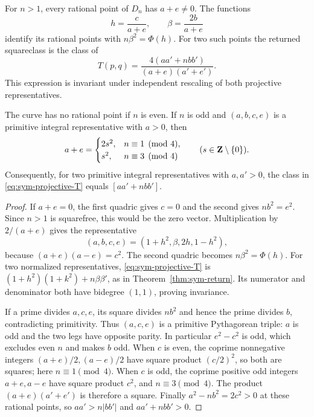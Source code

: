 \begin{proposition}
\label{prop:sym-normalization}
For $n>1$, every rational point of $D_n$ has $a+e\ne0$.
The functions
\[
 h=\frac{c}{a+e},\qquad \beta=\frac{2b}{a+e}
\]
identify its rational points with $n\beta^2=\Phi(h)$.
For two such points the returned squareclass is the class of
\begin{equation}
 T(p,q)=\frac{4(aa'+nbb')}{(a+e)(a'+e')}.
 \label{eq:sym-projective-T}
\end{equation}
This expression is invariant under independent rescaling of both
projective representatives.

The curve has no rational point if $n$ is even.  If $n$ is odd and
$(a,b,c,e)$ is a primitive integral representative with $a>0$, then
\[
 a+e=
 \begin{cases}
 2s^2,&n\equiv1\pmod4,\\
 s^2,&n\equiv3\pmod4
 \end{cases}
 \qquad(s\in\mathbf Z\setminus\{0\}).
\]
Consequently, for two primitive integral representatives with
$a,a'>0$, the class in \eqref{eq:sym-projective-T} equals
$[aa'+nbb']$.
\end{proposition}

\begin{proof}
If $a+e=0$, the first quadric gives $c=0$ and the second gives
$nb^2=e^2$.  Since $n>1$ is squarefree, this would be the zero
vector.  Multiplication by $2/(a+e)$ gives the representative
\[
 (a,b,c,e)=(1+h^2,\beta,2h,1-h^2),
\]
because $(a+e)(a-e)=c^2$.  The second quadric becomes
$n\beta^2=\Phi(h)$.  For two normalized representatives,
\eqref{eq:sym-projective-T} is
$(1+h^2)(1+k^2)+n\beta\beta'$, as in
Theorem~\ref{thm:sym-return}.  Its numerator and denominator both
have bidegree $(1,1)$, proving invariance.

If a prime divides $a,c,e$, its square divides $nb^2$ and hence
the prime divides $b$, contradicting primitivity.  Thus
$(a,c,e)$ is a primitive Pythagorean triple: $a$ is odd and the
two legs have opposite parity.  In particular $e^2-c^2$ is odd,
which excludes even $n$ and makes $b$ odd.  When $c$ is even,
the coprime nonnegative integers $(a+e)/2,(a-e)/2$ have square
product $(c/2)^2$, so both are squares; here $n\equiv1\pmod4$.
When $c$ is odd, the coprime positive odd integers $a+e,a-e$
have square product $c^2$, and $n\equiv3\pmod4$.
The product $(a+e)(a'+e')$ is therefore a square.  Finally
$a^2-nb^2=2c^2>0$ at these rational points, so
$aa'>n|bb'|$ and $aa'+nbb'>0$.
\end{proof}

